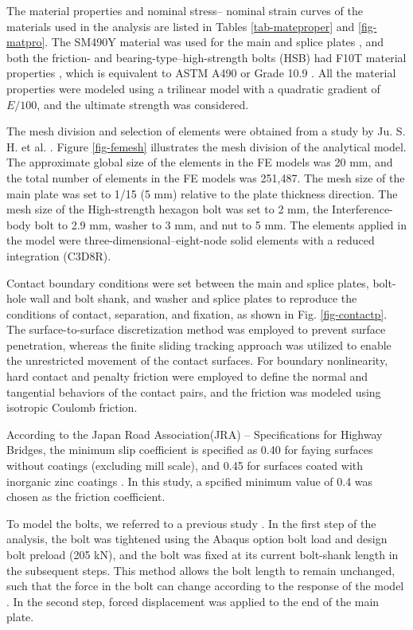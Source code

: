 The material properties and nominal stress-- nominal strain curves of the materials used in the analysis are listed in Tables \ref{tab-mateproper} and \ref{fig-matpro}. The SM490Y material was used for the main and splice plates  \cite{JISsteel}, and both the friction- and bearing-type--high-strength bolts  (HSB) had F10T material properties \cite{JISbolt}, which is equivalent to ASTM A490 or Grade 10.9 \cite{ASTM-bolt,ISO-bolt}. All the material properties were modeled using a trilinear model with a quadratic gradient of $E/100$, and the ultimate strength was considered. \par

The mesh division and selection of elements were obtained from a study by Ju. S. H. et al. \cite{ju2004-boltfea}. Figure  \ref{fig-femesh} illustrates the mesh division of the analytical model. The approximate global size of the elements in the FE models was 20 mm, and the total number of elements in the FE models was 251,487. The mesh size of the main plate was set to 1/15 (5 mm) relative to the plate thickness direction. The mesh size of the High-strength hexagon bolt was set to 2 mm, the Interference-body bolt to 2.9 mm, washer to 3 mm, and nut to 5 mm. The elements applied in the model were three-dimensional--eight-node solid elements with a reduced integration (C3D8R). \par
Contact boundary conditions were set between the main and splice plates, bolt-hole wall and bolt shank, and washer and splice plates to reproduce the conditions of contact, separation, and fixation, as shown in Fig. \ref{fig-contactp}. The surface-to-surface discretization method was employed to prevent surface penetration, whereas the finite sliding tracking approach was utilized to enable the unrestricted movement of the contact surfaces. For boundary nonlinearity, hard contact and penalty friction were employed to define the normal and tangential behaviors of the contact pairs, and the friction was modeled using isotropic Coulomb friction. 

According to the Japan Road Association(JRA) -- Specifications for Highway Bridges, the minimum slip coefficient is specified as 0.40 for faying surfaces without coatings (excluding mill scale), and 0.45 for surfaces coated with inorganic zinc coatings \cite{douji2017,shishin2009}. In this study, a spcified minimum value of 0.4 was chosen as the friction coefficient. \par
To model the bolts, we referred to a previous study \cite{Kim2007,hung1996,Shimozato2008ExperrimentalModel}. In the first step of the analysis, the bolt was tightened using the Abaqus option bolt load and design bolt preload (205 kN), and the bolt was fixed at its current bolt-shank length in the subsequent steps. This method allows the bolt length to remain unchanged, such that the force in the bolt can change according to the response of the model \cite{Smith2020}. In the second step, forced displacement was applied to the end of the main plate.


